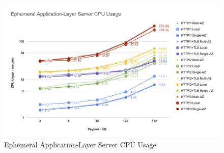 \begin{figure}[h!]
    \centering
    \includegraphics[width=\linewidth]{figures/charts/Ephemeral Application-Layer Server CPU Usage.png}
    \caption{Ephemeral Application-Layer Server CPU Usage}
    \label{fig:ephemeral_server_application_cpu}
\end{figure}

